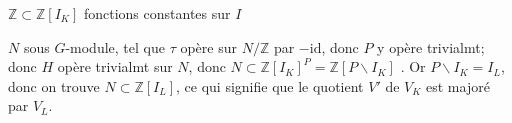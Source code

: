 
$\mathbb Z\subset\mathbb Z[I_K]$ fonctions constantes sur $I$


$N$ sous $G$-module, tel que $\tau$ opère sur $N/\mathbb Z$ par $-\mathrm{id}$,
donc $P$ y opère trivialmt; donc $H$ opère trivialmt sur $N$, donc
$N\subset\mathbb Z[I_K]^P=\mathbb Z[P\backslash I_K]$
.
Or $P\backslash I_K=I_L$, donc on trouve \deleted{$\unsure{\subset}$}
$N\subset\mathbb Z[I_L]$, ce qui signifie que le quotient $V'$ de $V_K$ est majoré par $V_L$.

